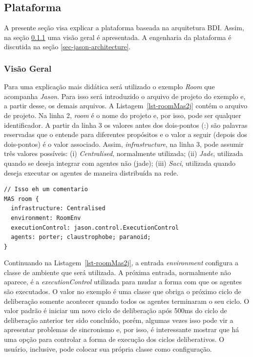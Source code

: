 \subsection{Plataforma \jason} \label{sec:aoppj}

A presente seção visa explicar a plataforma \jason baseada na arquitetura BDI.
Assim, na seção \ref{sec-jason-overview} uma visão geral é apresentada.
A engenharia da plataforma é discutida na seção \ref{sec-jason-architecture}.

\subsubsection{Visão Geral} \label{sec-jason-overview}

Para uma explicação mais didática será utilizado o
exemplo \emph{Room} que acompanha \emph{Jason}. Para isso será introduzido
o arquivo de projeto do exemplo e, a partir desse, os demais arquivos.
A Listagem~\ref{lst-roomMas2j} contém o arquivo de projeto.
Na linha 2, \emph{room} é o nome do projeto e, por isso, pode ser qualquer
identificador. A partir da linha 3 os valores antes dos dois-pontos (:)
são palavras reservadas que o \jason entende para diferentes propósitos e o valor
a seguir (depois dos dois-pontos) é o valor associado.
Assim, \emph{infrastructure}, na linha 3, pode assumir três valores
possíveis: (i) \emph{Centralised}, normalmente utilizada;
(ii) \emph{Jade}, utilizada quando se deseja integrar
com agentes não \jason (jade); (iii) \emph{Saci}, utilizada
quando deseja executar os agentes de maneira distribuída na rede.

\begin{center}
    \begin{minipage}{120mm}
	\lstset{linewidth=120mm}
	\begin{lstlisting}[frame=trbl, caption=Arquivo de projeto do \jason para o exemplo \emph{Room}, label=lst-roomMas2j]
// Isso eh um comentario
MAS room {
  infrastructure: Centralised
  environment: RoomEnv
  executionControl: jason.control.ExecutionControl
  agents: porter; claustrophobe; paranoid;
}
	\end{lstlisting}
    \end{minipage}
\end{center}

Continuando na Listagem~\ref{lst-roomMas2j}, a entrada \emph{environment}
configura a classe de ambiente que será utilizada. A próxima entrada,
normalmente não aparece, é a \emph{executionControl} utilizada para
mudar a forma com que os agentes são executados. O valor no exemplo é uma
classe que obriga o próximo ciclo de deliberação somente acontecer quando
todos os agentes terminaram o seu ciclo. O valor padrão é iniciar um novo
ciclo de deliberação após 500ms do ciclo de deliberação anterior ter sido
concluído, porém, algumas vezes isso
pode vir a apresentar problemas de sincronismo e, por isso, é interessante
mostrar que há uma opção para controlar a forma de execução dos ciclos
deliberativos. O usuário, inclusive, pode colocar sua própria classe como
configuração.

